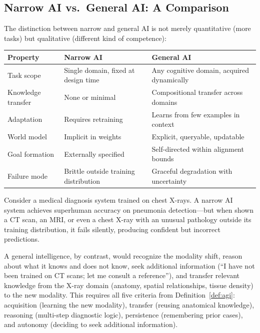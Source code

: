 \subsection{Narrow AI vs.\ General AI: A Comparison}

The distinction between narrow and general AI is not merely quantitative (more tasks) but qualitative (different kind of competence):

\begin{center}
\renewcommand{\arraystretch}{1.2}
\begin{tabular}{p{3.5cm}p{5cm}p{5cm}}
\toprule
\textbf{Property} & \textbf{Narrow AI} & \textbf{General AI} \\
\midrule
Task scope & Single domain, fixed at design time & Any cognitive domain, acquired dynamically \\
Knowledge transfer & None or minimal & Compositional transfer across domains \\
Adaptation & Requires retraining & Learns from few examples in context \\
World model & Implicit in weights & Explicit, queryable, updatable \\
Goal formation & Externally specified & Self-directed within alignment bounds \\
Failure mode & Brittle outside training distribution & Graceful degradation with uncertainty \\
\bottomrule
\end{tabular}
\end{center}

\begin{example}
Consider a medical diagnosis system trained on chest X-rays. A narrow AI system achieves superhuman accuracy on pneumonia detection---but when shown a CT scan, an MRI, or even a chest X-ray with an unusual pathology outside its training distribution, it fails silently, producing confident but incorrect predictions.

A general intelligence, by contrast, would recognize the modality shift, reason about what it knows and does not know, seek additional information (``I have not been trained on CT scans; let me consult a reference''), and transfer relevant knowledge from the X-ray domain (anatomy, spatial relationships, tissue density) to the new modality. This requires all five criteria from Definition~\ref{def:agi}: acquisition (learning the new modality), transfer (reusing anatomical knowledge), reasoning (multi-step diagnostic logic), persistence (remembering prior cases), and autonomy (deciding to seek additional information).
\end{example}

